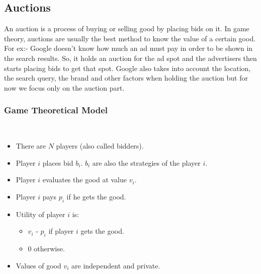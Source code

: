 \subsection{Auctions}

An auction is a process of buying or selling good by placing bids on it. In game theory, auctions are usually the best method to know the value of a certain good. For ex:- Google doesn't know how much an ad must pay in order to be shown in the search results. So, it holds an auction for the ad spot and the advertisers then starts placing bids to get that spot. Google also takes into account the location, the search query, the brand and other factors when holding the auction but for now we focus only on the auction part.\\

\subsubsection{\textbf{Game Theoretical Model}}\\
\begin{itemize}
    \item There are $N$ players (also called bidders).
    \item Player $i$ places bid $b_i$. $b_i$ are also the strategies of the player $i$.
    \item Player $i$ evaluates the good at value $v_i$.
    \item Player $i$ pays $p_i$ if he gets the good.
    \item Utility of player $i$ is:
    \begin{itemize}
        \item $v_i$ - $p_i$ if player $i$ gets the good.
        \item 0 otherwise.
    \end{itemize}
    \item Values of good $v_i$ are independent and private.
\end{itemize}

